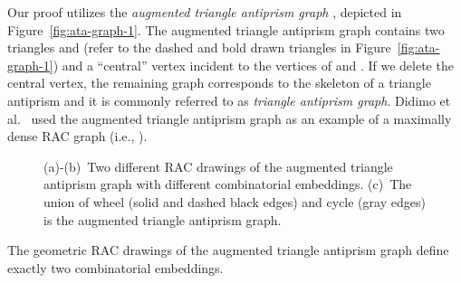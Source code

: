 \documentclass{llncs}
\begin{document}
Our proof utilizes the \emph{augmented triangle antiprism graph}
\cite{ABS11,DEL09}, depicted in Figure~\ref{fig:ata-graph-1}. The
augmented triangle antiprism graph contains two triangles
 and  (refer to the dashed and bold
drawn triangles in Figure~\ref{fig:ata-graph-1}) and a ``central''
vertex  incident to the vertices of  and
. If we delete the central vertex, the remaining
graph corresponds to the skeleton of a triangle antiprism and it is
commonly referred to as \emph{triangle antiprism graph}. Didimo et
al.\ \cite{DEL09} used the augmented triangle antiprism graph as an
example of a maximally dense RAC graph (i.e., ).


\begin{figure}[h!tb]
  \centering
  \begin{minipage}[b]{.32\textwidth}
     \raggedleft
  \end{minipage}
  \hfill
  \begin{minipage}[b]{.32\textwidth}
     \raggedright
  \end{minipage}
  \hfill
  \begin{minipage}[b]{.32\textwidth}
     \raggedright
  \end{minipage}
  \caption{(a)-(b)~Two different RAC drawings of the augmented triangle antiprism graph with different combinatorial embeddings.
  (c)~The union of wheel  (solid and dashed black edges) and cycle  (gray edges) is
  the augmented triangle antiprism graph.}
  \label{fig:ata-graph}
\end{figure}

\begin{lemma}
\label{lem:ata-graph} The geometric RAC drawings of the augmented
triangle antiprism graph define exactly two combinatorial
embeddings.
\end{lemma}
\end{document}
